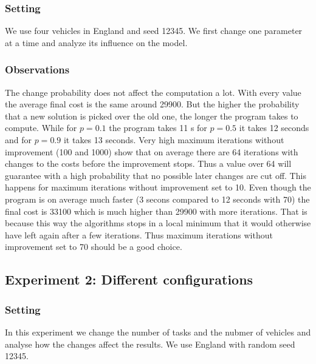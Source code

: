 \documentclass[11pt]{article}
\begin{document}
\subsubsection{Setting}
We use four vehicles in England and seed 12345. We first change one parameter at a time and analyze its influence on the model.

\subsubsection{Observations}
The change probability does not affect the computation a lot. With every value the average final cost is the same around 29900. But the higher the probability that a new solution is picked over the old one, the longer the program takes to compute. While for $p=0.1$ the program takes 11 s for $p=0.5$ it takes 12 seconds and for $p=0.9$ it takes 13 seconds. 
Very high maximum iterations without improvement (100 and 1000) show that on average there are 64 iterations with changes to the costs before the improvement stops. Thus a value over 64 will guarantee with a high probability that no possible later changes are cut off. This happens for maximum iterations without improvement set to 10. Even though the program is on average much faster (3 secons compared to 12 seconds with 70) the final cost is 33100 which is much higher than 29900 with more iterations. That is because this way the algorithms stops in a local minimum that it would otherwise have left again after a few iterations. Thus maximum iterations without improvement set to 70 should be a good choice.


\subsection{Experiment 2: Different configurations}

\subsubsection{Setting}
In this experiment we change the number of tasks and the nubmer of vehicles and analyse how the changes affect the results. We use England with random seed 12345.
\end{document}
